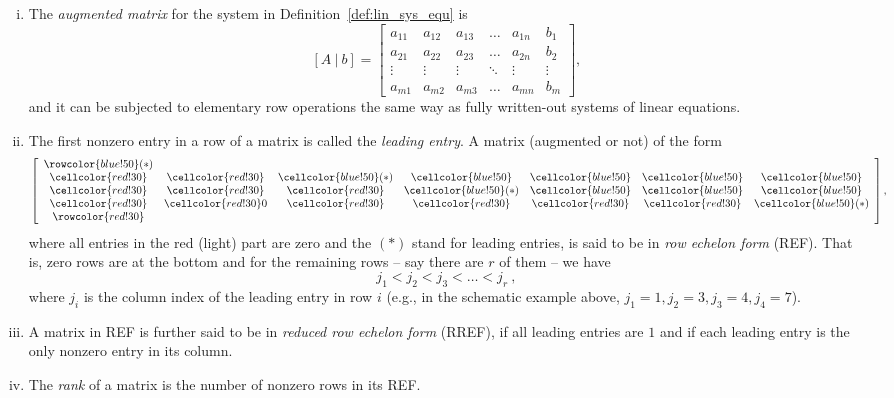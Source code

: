 \begin{definition}
\end{definition}
\begin{enumerate}[(i)]
	\item The \emph{augmented matrix} for the system in Definition~\ref{def:lin_sys_equ} is
	\[ [A\:|\:b] = \left[\begin{array}{ccccc|c}
	a_{11} & a_{12} & a_{13} & \dots & a_{1n} & b_1 \\
	a_{21} & a_{22} & a_{23} & \dots & a_{2n} & b_2 \\
	\vdots & \vdots & \vdots &\ddots & \vdots & \vdots \\
	a_{m1} & a_{m2} & a_{m3} & \dots & a_{mn} & b_m 
	\end{array}\right], \]
	and it can be subjected to elementary row operations the same way as fully written-out systems of linear equations.
	\item The first nonzero entry in a row of a matrix is called the \emph{leading entry}. A matrix (augmented or not) of the form
	\[ \left[\begin{array}{ccccccc}
	\rowcolor{blue!50}
	(*) & \phantom{(*)} & \phantom{(*)} & \phantom{(*)} & \phantom{(*)} & \phantom{(*)} & \phantom{(*)} \\
	\cellcolor{red!30} & \cellcolor{red!30} & \cellcolor{blue!50}(*) & \cellcolor{blue!50} & \cellcolor{blue!50} & \cellcolor{blue!50} & \cellcolor{blue!50} \\
	\cellcolor{red!30} & \cellcolor{red!30} & \cellcolor{red!30} & \cellcolor{blue!50}(*) & \cellcolor{blue!50}& \cellcolor{blue!50} & \cellcolor{blue!50} \\ 
	\cellcolor{red!30} & \cellcolor{red!30}0 & \cellcolor{red!30} & \cellcolor{red!30} & \cellcolor{red!30} & \cellcolor{red!30} & \cellcolor{blue!50}(*) \\ 
	\rowcolor{red!30}
	& & & & & & 
	\end{array}\right], \]
	where all entries in the red (light) part are zero and the $(*)$ stand for leading entries, is said to be in \emph{row echelon form} (REF). That is, zero rows are at the bottom and for the remaining rows -- say there are $r$ of them -- we have
	\[ j_1 < j_2 < j_3 < \dots < j_r \:, \]
	where $j_i$ is the column index of the leading entry in row $i$ (e.g., in the schematic example above, $j_1=1,j_2=3,j_3=4,j_4=7$).
	\item A matrix in REF is further said to be in \emph{reduced row echelon form} (RREF), if all leading entries are $1$ and if each leading entry is the only nonzero entry in its column.
	\item The \emph{rank} of a matrix is the number of nonzero rows in its REF.
\end{enumerate}


